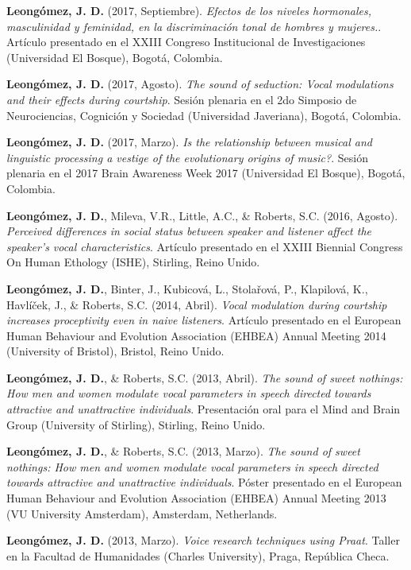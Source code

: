 \documentclass[11pt, a4paper]{awesome-cv}
\begin{document}
\textbf{Leongómez, J. D.} (2017, Septiembre). \emph{Efectos de los
niveles hormonales, masculinidad y feminidad, en la discriminación tonal
de hombres y mujeres.}. Artículo presentado en el XXIII Congreso
Institucional de Investigaciones (Universidad El Bosque), Bogotá,
Colombia.

\textbf{Leongómez, J. D.} (2017, Agosto). \emph{The sound of seduction:
Vocal modulations and their effects during courtship}. Sesión plenaria
en el 2do Simposio de Neurociencias, Cognición y Sociedad (Universidad
Javeriana), Bogotá, Colombia.

\textbf{Leongómez, J. D.} (2017, Marzo). \emph{Is the relationship
between musical and linguistic processing a vestige of the evolutionary
origins of music?}. Sesión plenaria en el 2017 Brain Awareness Week 2017
(Universidad El Bosque), Bogotá, Colombia.

\textbf{Leongómez, J. D.}, Mileva, V.R., Little, A.C., \& Roberts, S.C.
(2016, Agosto). \emph{Perceived differences in social status between
speaker and listener affect the speaker's vocal characteristics}.
Artículo presentado en el XXIII Biennial Congress On Human Ethology
(ISHE), Stirling, Reino Unido.

\textbf{Leongómez, J. D.}, Binter, J., Kubicová, L., Stolařová, P.,
Klapilová, K., Havlíček, J., \& Roberts, S.C. (2014, Abril). \emph{Vocal
modulation during courtship increases proceptivity even in naive
listeners}. Artículo presentado en el European Human Behaviour and
Evolution Association (EHBEA) Annual Meeting 2014 (University of
Bristol), Bristol, Reino Unido.

\textbf{Leongómez, J. D.}, \& Roberts, S.C. (2013, Abril). \emph{The
sound of sweet nothings: How men and women modulate vocal parameters in
speech directed towards attractive and unattractive individuals}.
Presentación oral para el Mind and Brain Group (University of Stirling),
Stirling, Reino Unido.

\textbf{Leongómez, J. D.}, \& Roberts, S.C. (2013, Marzo). \emph{The
sound of sweet nothings: How men and women modulate vocal parameters in
speech directed towards attractive and unattractive individuals}. Póster
presentado en el European Human Behaviour and Evolution Association
(EHBEA) Annual Meeting 2013 (VU University Amsterdam), Amsterdam,
Netherlands.

\textbf{Leongómez, J. D.} (2013, Marzo). \emph{Voice research techniques
using Praat}. Taller en la Facultad de Humanidades (Charles University),
Praga, República Checa.
\end{document}

